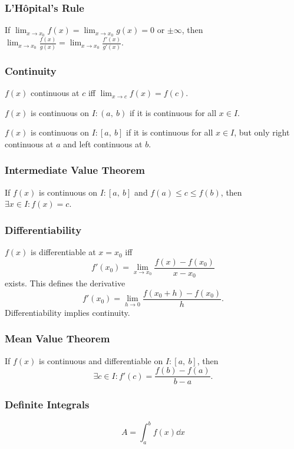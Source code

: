 \documentclass{article}
\begin{document}
\begin{multicols}{3}
    \subsubsection*{L'H\^opital's Rule}
    If $\displaystyle \lim_{x\to x_0}f(x)=\lim_{x\to x_0}g(x)=0$ or $\pm\infty$, then
    $\displaystyle \lim_{x\to x_0}\frac{f(x)}{g(x)} = \lim_{x\to x_0}\frac{f'(x)}{g'(x)}$.
    \subsubsection*{Continuity}
    $f(x)$ continuous at $c$ iff $\displaystyle \lim_{x\to c} f(x) = f(c)$.

    $f(x)$ is continuous on $I:\left( a,\:b \right)$ if it is continuous
    for all $x\in I$.

    $f(x)$ is continuous on $I:\left[ a,\:b \right]$ if it is continuous
    for all $x\in I$, but only right continuous at $a$ and left continuous at $b$.
    \subsubsection*{Intermediate Value Theorem}
    If $f(x)$ is continuous on $I:\left[ a, \: b \right]$ and $f(a) \leq c \leq f(b)$, then $\exists x\in I:f(x)=c$.
    \subsubsection*{Differentiability}
    $f(x)$ is differentiable at $x=x_0$ iff
    \begin{equation*}
        f'(x_0) = \lim_{x\to x_0} \frac{f(x)-f(x_0)}{x-x_0}
    \end{equation*}
    exists. This defines the derivative
    \begin{equation*}
        f'(x_0) = \lim_{h\to 0} \frac{f(x_0+h)-f(x_0)}{h}.
    \end{equation*}
    Differentiability implies continuity.
    \subsubsection*{Mean Value Theorem}
    If $f(x)$ is continuous and differentiable on $I:\left[ a,\:b \right]$, then
    \begin{equation*}
        \exists c\in I:f'(c)=\frac{f(b)-f(a)}{b-a}.
    \end{equation*}
    \subsubsection*{Definite Integrals}
    \begin{equation*}
        A = \int_a^b f(x) \dd{x}
    \end{equation*}

\end{multicols}
\end{document}
